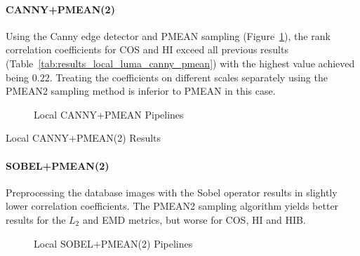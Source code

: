 \FloatBarrier
\paragraph{CANNY+PMEAN(2)}

Using the Canny edge detector and PMEAN sampling
(Figure~\ref{fig:pipeline_local_luma_canny_pmean}), the rank correlation
coefficients for COS and HI exceed all previous results
(Table~\ref{tab:results_local_luma_canny_pmean}) with the highest value
achieved being $0.22$. Treating the coefficients on different scales separately
using the PMEAN2 sampling method is inferior to PMEAN in this case.

\begin{figure}[h]
    \centering
    
    \caption[Local CANNY+PMEAN Pipelines]{
        Local CANNY+PMEAN Pipelines
    }
    \label{fig:pipeline_local_luma_canny_pmean}
\end{figure}

\begin{table}[h]
    \centering
    \quad
    \caption[Local CANNY+PMEAN(2) Results]{
        Local CANNY+PMEAN(2) Results
    }
    \label{tab:results_local_luma_canny_pmean_all}
\end{table}

\FloatBarrier
\paragraph{SOBEL+PMEAN(2)}

Preprocessing the database images with the Sobel operator results in slightly
lower correlation coefficients. The PMEAN2 sampling algorithm yields better
results for the $L_2$ and EMD metrics, but worse for COS, HI and HIB.

\begin{figure}[h]
    \centering
    
    \caption[Local SOBEL+PMEAN(2) Pipelines]{
        Local SOBEL+PMEAN(2) Pipelines
    }
    \label{fig:pipeline_local_luma_sobel_pmean}
\end{figure}


